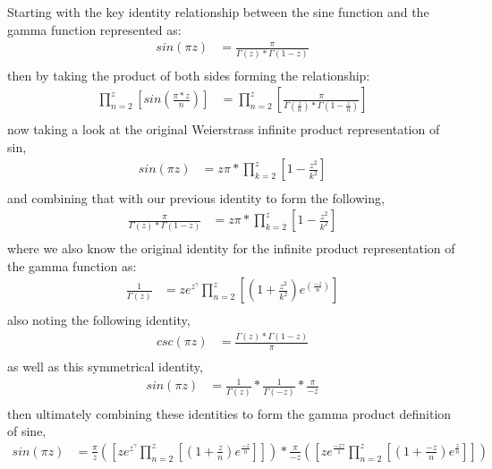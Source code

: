 \documentclass{article}
\begin{document}
Starting with the key identity relationship between the sine function and the gamma function represented as:
\begin{align*}
sin(\pi z) &= \frac{\pi}{\Gamma\left(z\right) * \Gamma\left(1 - z\right)} \\
\end{align*}
then by taking the product of both sides forming the relationship:
\begin{align*}
\prod_{n=2}^z\left[sin(\frac{\pi * z}{n})\right] &= \prod_{n=2}^z\left[\frac{\pi}{\Gamma\left(\frac{z}{n}\right) * \Gamma\left(1 - \frac{z}{n}\right)}\right] \\
\end{align*}
now taking a look at the original Weierstrass infinite product representation of sin,
\begin{align*}
sin(\pi z) &= z\pi * \prod_{k=2}^z\left[1 - \frac{z^2}{k^2}\right] \\
\end{align*}
and combining that with our previous identity to form the following,
\begin{align*}
\frac{\pi}{\Gamma\left(z\right) * \Gamma\left(1 - z\right)} &= z\pi * \prod_{k=2}^z\left[1 - \frac{z^2}{k^2}\right] \\
\end{align*}
where we also know the original identity for the infinite product representation of the gamma function as:
\begin{align*}
\frac{1}{\Gamma\left(z\right)} &= ze^z^\gamma \prod_{n=2}^z\left[\left(1 + \frac{z^2}{k^2}\right)e^\left(\frac{-z}{n}\right)\right] \\
\end{align*}
also noting the following identity,
\begin{align*}
csc(\pi z) &= \frac{\Gamma\left(z\right) * \Gamma\left(1 - z\right)}{\pi} \\
\end{align*}
as well as this symmetrical identity,
\begin{align*}
sin(\pi z) &= \frac{1}{\Gamma\left(z\right)} * \frac{1}{\Gamma\left(- z\right)} * \frac{\pi}{-z} \\
\end{align*}
then ultimately combining these identities to form the gamma product definition of sine,
\begin{align*}
sin(\pi z) &= \frac{\pi}{z} \left(\left[ze^z^\gamma \prod_{n=2}^z \left[\left(1 + \frac{z}{n}\right)e^\frac{-z}{n}\right]\right]\right) * \frac{\pi}{-z} \left(\left[ze^\frac{-z\gamma}{1} \prod_{n=2}^z \left[\left(1 + \frac{-z}{n}\right)e^\frac{z}{n}\right]\right]\right)
\end{align*}
\end{document}
